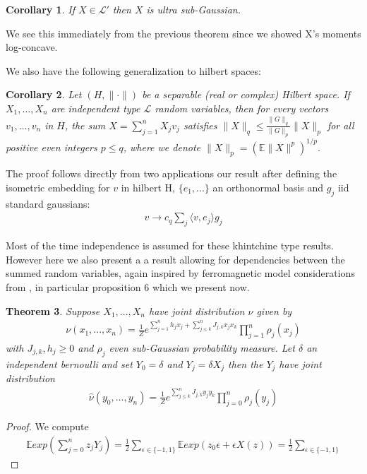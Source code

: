 \documentclass[10pt]{article}
\newcommand{\E}{\mathbb{E}}
\newcommand{\1}{\textbf{1}}
\newtheorem{theorem}{Theorem}
\newtheorem{corollary}[theorem]{Corollary}
\theoremstyle{remark}
\theoremstyle{definition}
\begin{document}
\begin{corollary}
	If $X \in \mathcal{L}'$ then $X$ is ultra sub-Gaussian. 
\end{corollary}

We see this immediately from the previous theorem since we showed X's moments log-concave. 

We also have the following generalization to hilbert spaces: 

\begin{corollary}
Let $(H,\|\cdot\|)$ be a separable (real or complex) Hilbert space. If $X_1, \ldots, X_n$ are independent type $\mathcal{L}$ random variables, then for every vectors $v_1, \ldots, v_n$ in $H$, the sum $X = \sum_{j=1}^n X_jv_j$ satisfies $\|X\|_q \leq \frac{\|G\|_q}{\|G\|_p}\|X\|_p$ for all positive even integers $p \leq q$, where we denote $\|X\|_p = (\E\|X\|^p)^{1/p}$.
\end{corollary}

The proof follows directly from two applications our result after defining the isometric embedding for $v$ in hilbert H, $\{e_1,...\}$ an orthonormal basis and $g_j$ iid standard gaussians:
\begin{align*}
	v \to c_q \sum_j \langle v,e_j\rangle g_j
\end{align*}

Most of the time independence is assumed for these khintchine type results. However here we also present a a result allowing for dependencies between the summed random variables, again inspired by ferromagnetic model considerations from \cite{GN}, in particular proposition 6 which we present now.

\begin{theorem}
	Suppose $X_1,...,X_n$ have joint distribution $\nu$ given by 
	\begin{align*}
		\nu(x_1,...,x_n) = \frac{1}{Z}e^{\sum_{j=1}^n h_j x_j + \sum_{j \leq k}^n J_{j,k}x_jx_k}\prod_{j=1}^n \rho_j(x_j)
	\end{align*}
	with $J_{j,k},h_j \geq 0$ and $\rho_j$ even sub-Gaussian probability measure. Let $\delta$ an independent bernoulli and set $Y_0 = \delta$ and $Y_j = \delta X_j$ then the $Y_j$ have joint distribution 
	\begin{align*}
		\hat{\nu}(y_0,...,y_n) = \frac{1}{Z}e^{\sum_{j \leq k}^n J_{j,k}y_jy_k}\prod_{j=0}^n \rho_j(y_j)
	\end{align*}
\end{theorem}

\begin{proof}
	We compute
	\begin{align*}
		\E exp(\sum_{j=0}^n z_jY_j) = \frac{1}{2}\sum_{\epsilon \in \{-1,1\}} \E exp(z_0\epsilon + \epsilon X(z)) = \frac{1}{2}\sum_{\epsilon \in \{-1,1\}}
	\end{align*}
\end{proof}
\end{document}
